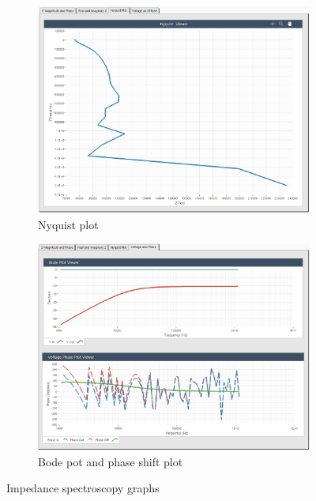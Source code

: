 \begin{figure}[h]
    \vspace{0.2in}
    \vfill
    \begin{subfigure}[b]{0.48\textwidth}
        \centering
        \includegraphics[width=\textwidth]{images/labview_nyquist_graph.png}
        \caption{Nyquist plot}
        \label{fig:labview_nyquist_plot}
    \end{subfigure}
    \hfill
    \begin{subfigure}[b]{0.48\textwidth}
        \centering
        \includegraphics[width=\textwidth]{images/labview_bode_phase_graph.png}
        \caption{Bode pot and phase shift plot}
        \label{fig:labview_bode-phase_plot}
    \end{subfigure}
    \caption{Impedance spectroscopy graphs}
    \label{fig:labview_IS_graphs}
\end{figure}

